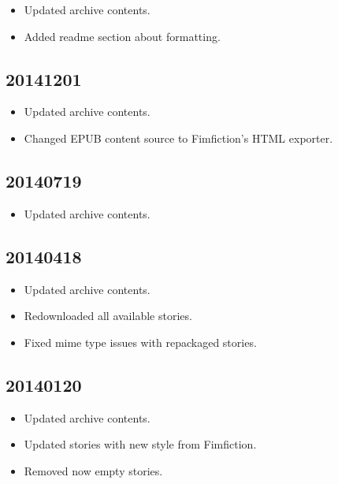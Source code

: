 \documentclass[hidelinks,a4paper,12pt]{article}
\begin{document}
\begin{itemize}
\item Updated archive contents.
\item Added readme section about formatting.
\end{itemize}

\subsection{20141201} \label{sec:changelog_20141201}

\begin{itemize}
\item Updated archive contents.
\item Changed EPUB content source to Fimfiction's HTML exporter.
\end{itemize}

\subsection{20140719} \label{sec:changelog_20140719}

\begin{itemize}
\item Updated archive contents.
\end{itemize}

\subsection{20140418} \label{sec:changelog_20140418}

\begin{itemize}
\item Updated archive contents.
\item Redownloaded all available stories.
\item Fixed mime type issues with repackaged stories.
\end{itemize}

\subsection{20140120} \label{sec:changelog_20140120}

\begin{itemize}
\item Updated archive contents.
\item Updated stories with new style from Fimfiction.
\item Removed now empty stories.
\end{itemize}
\end{document}
